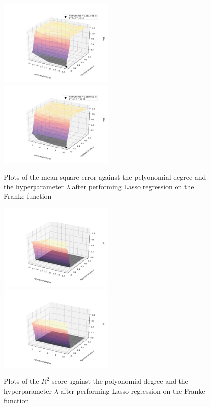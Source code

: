 \documentclass[a4paper,10pt,english]{article}
\begin{document}
\begin{figure}[H]
	\centering 
	\includegraphics[width = 0.5\textwidth, center]{../franke_output/part_E_2.png}
	\includegraphics[width = 0.5\textwidth, center]{../franke_output/part_E_2_highdeg.png}
	\caption{
		Plots of the mean square error against the polyonomial degree and the hyperparameter $\lambda$ after performing Lasso regression on the Franke-function 
	}
	\label{part_e2}
\end{figure}

\begin{figure}[H]
	\centering 
	\includegraphics[width = 0.5\textwidth, center]{../franke_output/part_E_3.png}
	\includegraphics[width = 0.5\textwidth, center]{../franke_output/part_E_3_highdeg.png}
	\caption{
		Plots of the $R^2$-score against the polyonomial degree and the hyperparameter $\lambda$ after performing Lasso regression on the Franke-function
	}
	\label{part_e3}
\end{figure}
\end{document}
